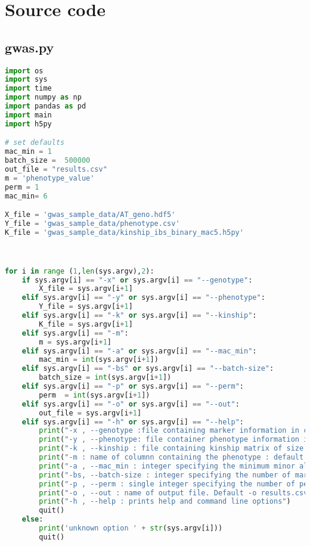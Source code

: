 

\chapter{Source code} %

\label{AppendixA} %

\linespread{1.5} 
\section{gwas.py}
\begin{lstlisting}[language=Python]
import os
import sys
import time
import numpy as np
import pandas as pd
import main
import h5py

# set defaults 
mac_min = 1
batch_size =  500000 
out_file = "results.csv"
m = 'phenotype_value'
perm = 1
mac_min= 6

X_file = 'gwas_sample_data/AT_geno.hdf5'
Y_file = 'gwas_sample_data/phenotype.csv'
K_file = 'gwas_sample_data/kinship_ibs_binary_mac5.h5py'



for i in range (1,len(sys.argv),2):
    if sys.argv[i] == "-x" or sys.argv[i] == "--genotype":
        X_file = sys.argv[i+1]
    elif sys.argv[i] == "-y" or sys.argv[i] == "--phenotype":
        Y_file = sys.argv[i+1]
    elif sys.argv[i] == "-k" or sys.argv[i] == "--kinship":
        K_file = sys.argv[i+1]
    elif sys.argv[i] == "-m":
        m = sys.argv[i+1]
    elif sys.argv[i] == "-a" or sys.argv[i] == "--mac_min":
        mac_min = int(sys.argv[i+1])
    elif sys.argv[i] == "-bs" or sys.argv[i] == "--batch-size":
        batch_size = int(sys.argv[i+1])
    elif sys.argv[i] == "-p" or sys.argv[i] == "--perm":
        perm  = int(sys.argv[i+1])
    elif sys.argv[i] == "-o" or sys.argv[i] == "--out":
        out_file = sys.argv[i+1]
    elif sys.argv[i] == "-h" or sys.argv[i] == "--help":
        print("-x , --genotype :file containing marker information in csv or hdf5 format of size")
        print("-y , --phenotype: file container phenotype information in csv format"  )
        print("-k , --kinship : file containing kinship matrix of size k X k in csv or hdf5 format")
        print("-m : name of columnn containing the phenotype : default m = phenotype_value")
        print("-a , --mac_min : integer specifying the minimum minor allele count necessary for a marker to be included. Default a = 1" )
        print("-bs, --batch-size : integer specifying the number of markers processed at once. Default -bs 500000" )
        print("-p , --perm : single integer specifying the number of permutations. Default 1 == no perm ")
        print("-o , --out : name of output file. Default -o results.csv  ")
        print("-h , --help : prints help and command line options")
        quit()
    else:
        print('unknown option ' + str(sys.argv[i]))
        quit()




\end{lstlisting}

